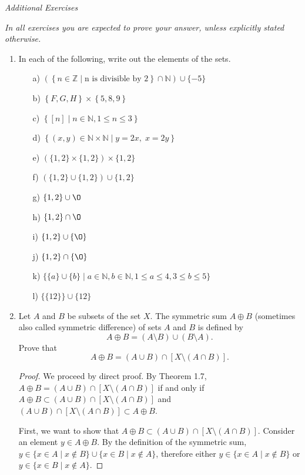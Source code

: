 \documentclass[11pt]{article}
\newcommand{\bbN}{\mathbb{N}}
\newcommand{\bbZ}{\mathbb{Z}}
\renewcommand{\emptyset}{\O}
\theoremstyle{definition}
\numberwithin{equation}{subsection}
\begin{document}
\begin{center}
{\em Additional Exercises}
\end{center}

{\em In all exercises you are expected to prove your answer, unless explicitly stated otherwise.}


\begin{enumerate}


\item In each of the following, write out the elements of the sets.

\begin{enumerate}
\item[a)] $(\left\{n \in \bbZ\mid \text{n is divisible by 2}\right\} \cap \bbN) \cup \{-5\}$ 
\item[b)] $\left\{F,G,H\right\}\times\left\{5,8,9\right\}$ 
\item[c)] $\left\{[n] \mid n \in \bbN, 1 \leq n \leq 3 \right\}$ 
\item[d)]  $\left\{ (x,y) \in \bbN \times \bbN \mid y = 2x,\; x = 2y \right\}$ 
\item[e)] $(\{1,2\} \times \{1,2\}) \times \{1,2\}$
\item[f)] $(\{1,2\} \cup \{1,2\}) \cup \{1,2\}$
\item[g)] $\{1,2\}\cup\emptyset$
\item[h)] $\{1,2\}\cap\emptyset$
\item[i)] $\{1,2\}\cup\{\emptyset\}$
\item[j)] $\{1,2\}\cap\{\emptyset\}$
\item[k)] $\{\{a\}\cup\{b\}\mid a \in \bbN, b \in \bbN, 1 \leq a \leq 4, 3 \leq b \leq 5\}$
\item[l)] $\{\{12\} \} \cup \{12\}$
\end{enumerate} 


\item Let $A$ and $B$ be subsets of the set $X.$ 
The symmetric sum $A\oplus B$ (sometimes also called symmetric difference) of sets $A$ and $B$ is defined by
$$A\oplus B=(A\setminus B)\cup (B\setminus A).$$
Prove that 
$$A\oplus B=(A\cup B)\cap [X\setminus(A\cap B)].$$

\begin{proof}
We proceed by direct proof. By Theorem 1.7, $A\oplus B=(A\cup B)\cap [X\setminus(A\cap B)]$ if and only if $A\oplus B\subset(A\cup B)\cap [X\setminus(A\cap B)]$ and $(A\cup B)\cap [X\setminus(A\cap B)] \subset A\oplus B$.

First, we want to show that $A\oplus B\subset(A\cup B)\cap [X\setminus(A\cap B)]$. Consider an element $y \in A\oplus B$. By the definition of the symmetric sum, $y \in \{x \in A \mid x \notin B\} \cup \{x \in B \mid x \notin A\}$, therefore either $y \in \{x \in A \mid x \notin B\}$ or $y \in \{x \in B \mid x \notin A\}$. 


\end{proof}
\end{enumerate}
\end{document}
